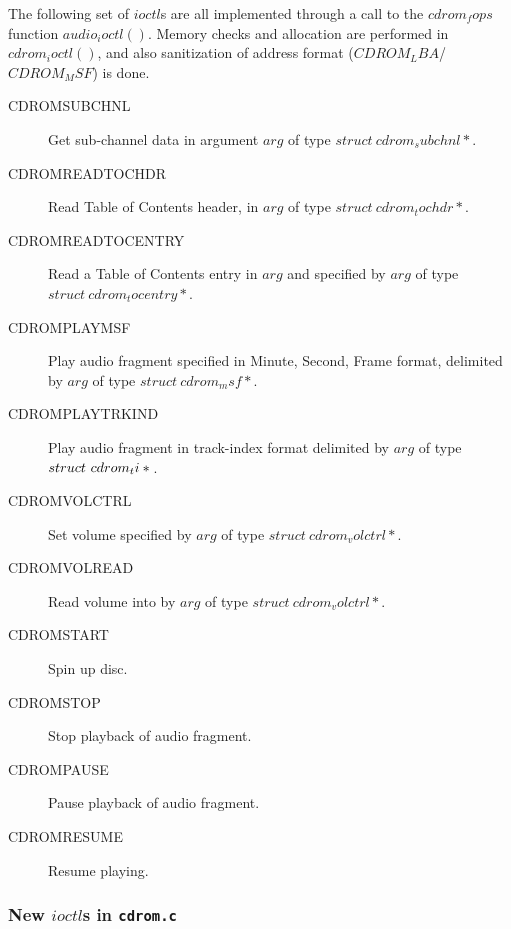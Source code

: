 \documentclass{article}
\def\cdromc{{\tt cdrom.c}}
\begin{document}
The following set of $ioctl$s are all implemented through a call to
the $cdrom_fops$ function $audio_ioctl()$. Memory checks and
allocation are performed in $cdrom_ioctl()$, and also sanitization of
address format ($CDROM_LBA$/$CDROM_MSF$) is done.
\begin{description}
\item[CDROMSUBCHNL] Get sub-channel data in argument $arg$ of type $struct\
cdrom_subchnl *{}$.
\item[CDROMREADTOCHDR] Read Table of Contents header, in $arg$ of type
$struct\ cdrom_tochdr *{}$. 
\item[CDROMREADTOCENTRY] Read a Table of Contents entry in $arg$ and
specified by $arg$ of type $struct\ cdrom_tocentry *{}$.
\item[CDROMPLAYMSF] Play audio fragment specified in Minute, Second,
Frame format, delimited by $arg$ of type $struct\ cdrom_msf *{}$.
\item[CDROMPLAYTRKIND] Play audio fragment in track-index format
delimited by $arg$ of type $struct\ \penalty-1000 cdrom_ti *{}$.
\item[CDROMVOLCTRL] Set volume specified by $arg$ of type $struct\
cdrom_volctrl *{}$.
\item[CDROMVOLREAD] Read volume into by $arg$ of type $struct\
cdrom_volctrl *{}$.
\item[CDROMSTART] Spin up disc.
\item[CDROMSTOP] Stop playback of audio fragment.
\item[CDROMPAUSE] Pause playback of audio fragment.
\item[CDROMRESUME] Resume playing.
\end{description}

\subsubsection{New $ioctl$s in \cdromc}
\end{document}
